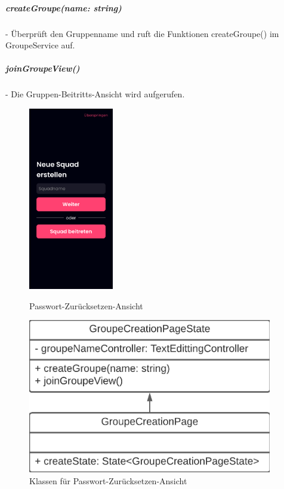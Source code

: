\documentclass[parskip=full]{scrartcl}
\begin{document}
            \subparagraph*{createGroupe(name: string)} - Überprüft den Gruppenname und ruft die Funktionen createGroupe() im GroupeService auf.
            \subparagraph*{joinGroupeView()} -  Die Gruppen-Beitritts-Ansicht wird aufgerufen.
    \begin{figure}[htp]
        \begin{minipage}
            [t]{0.49\textwidth}
            \centering
            \includegraphics[height=80mm]{images/Presentation-layer/GroupCreationView.jpg}
            \caption{Passwort-Zurücksetzen-Ansicht}
        \end{minipage}
        \begin{minipage}
            [t]{0.49\textwidth}
            \centering
            \includegraphics[width=0.95\textwidth]{images/Presentation-layer/GroupCreationViewClass.png}
            \caption{Klassen für Passwort-Zurücksetzen-Ansicht}
        \end{minipage}
    \end{figure}    
        
\end{document}
